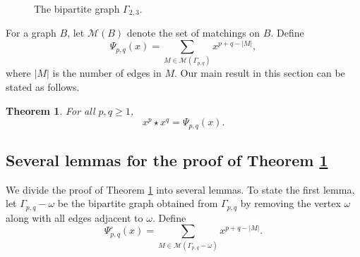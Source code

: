 \documentclass[12pt,a4paper,reqno]{amsart}
\numberwithin{equation}{section}
\newtheorem{theorem}{Theorem}[section]
\theoremstyle{definition}
\theoremstyle{remark}
\newcommand{\Match}{\mathcal M}
\begin{document}
\begin{figure}[htbp]
\centering
{}
\caption{The bipartite graph $\Gamma_{2,3}$.}
\label{fig:Gamma23}
\end{figure}

For a   graph $B$, let $\Match(B)$ denote the set of matchings on $B$.  Define
\[
 \Psi_{p,q}(x)
   =\sum_{M\in\Match(\Gamma_{p,q})}x^{p+q-|M|},
\]
where $|M|$ is the number of edges in $M$. Our main result in this section can be stated as follows. 


\begin{theorem}\label{thm:monomial-model}
For all $p,q\geq1$,
\begin{equation}\label{eq:monomial-model}
 x^p\star x^q=\Psi_{p,q}(x).
\end{equation}
\end{theorem}


 



 


\subsection{Several lemmas for the proof of Theorem \ref{thm:monomial-model}}


We divide the proof of Theorem \ref{thm:monomial-model} into several  lemmas.   
To state the first lemma, let $\Gamma_{p,q}-\omega$ be the bipartite graph obtained from $\Gamma_{p,q}$ by removing the vertex $\omega$ along with all edges adjacent to $\omega$. Define
\[
 \Psi^{\circ}_{p,q}(x)
=\sum_{M\in\Match(\Gamma_{p,q}-\omega)}x^{p+q-|M|}.
\]
\end{document}
